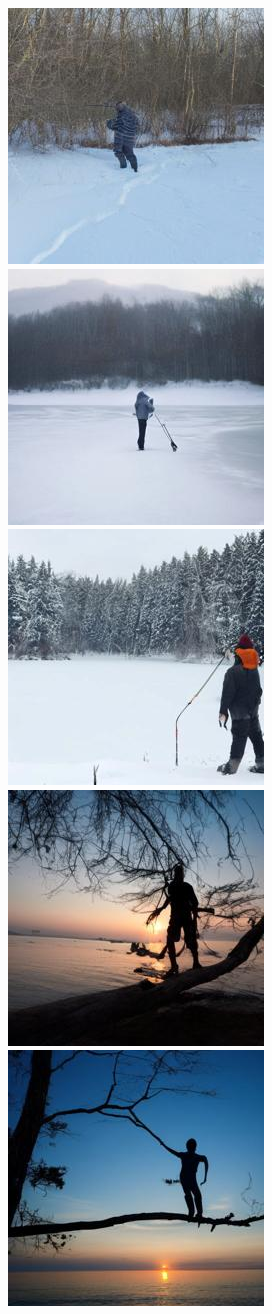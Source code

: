 \begin{figure}[h!]
\begin{subfigure}[t]{0.32\linewidth}
	\includegraphics[width=0.320\linewidth]{figs/samples_appendix_3/base_cfg_2_ode_prompt_65_image_1.jpg}\;%
	\includegraphics[width=0.320\linewidth]{figs/samples_appendix_3/base_cfg_2_ode_prompt_65_image_2.jpg}\;%
	\includegraphics[width=0.320\linewidth]{figs/samples_appendix_3/base_cfg_2_ode_prompt_65_image_3.jpg}\\ 
	\includegraphics[width=0.320\linewidth]{figs/samples_appendix_3/base_cfg_2_ode_prompt_69_image_1.jpg}\;%
	\includegraphics[width=0.320\linewidth]{figs/samples_appendix_3/base_cfg_2_ode_prompt_69_image_2.jpg}\;%

\end{subfigure}
\end{figure}
